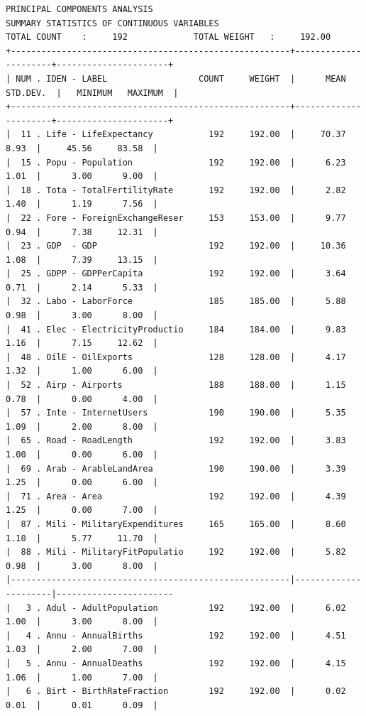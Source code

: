 \documentclass[a4paper,10pt,twocolumn]{article}
\begin{document}
\begin{landscape}
\begin{verbatim}
PRINCIPAL COMPONENTS ANALYSIS
SUMMARY STATISTICS OF CONTINUOUS VARIABLES
TOTAL COUNT    :     192             TOTAL WEIGHT   :     192.00
+-------------------------------------------------------+----------------------+----------------------+
| NUM . IDEN - LABEL                  COUNT     WEIGHT  |      MEAN  STD.DEV.  |   MINIMUM   MAXIMUM  |
+-------------------------------------------------------+----------------------+----------------------+
|  11 . Life - LifeExpectancy           192     192.00  |     70.37      8.93  |     45.56     83.58  |
|  15 . Popu - Population               192     192.00  |      6.23      1.01  |      3.00      9.00  |
|  18 . Tota - TotalFertilityRate       192     192.00  |      2.82      1.40  |      1.19      7.56  |
|  22 . Fore - ForeignExchangeReser     153     153.00  |      9.77      0.94  |      7.38     12.31  |
|  23 . GDP  - GDP                      192     192.00  |     10.36      1.08  |      7.39     13.15  |
|  25 . GDPP - GDPPerCapita             192     192.00  |      3.64      0.71  |      2.14      5.33  |
|  32 . Labo - LaborForce               185     185.00  |      5.88      0.98  |      3.00      8.00  |
|  41 . Elec - ElectricityProductio     184     184.00  |      9.83      1.16  |      7.15     12.62  |
|  48 . OilE - OilExports               128     128.00  |      4.17      1.32  |      1.00      6.00  |
|  52 . Airp - Airports                 188     188.00  |      1.15      0.78  |      0.00      4.00  |
|  57 . Inte - InternetUsers            190     190.00  |      5.35      1.09  |      2.00      8.00  |
|  65 . Road - RoadLength               192     192.00  |      3.83      1.00  |      0.00      6.00  |
|  69 . Arab - ArableLandArea           190     190.00  |      3.39      1.25  |      0.00      6.00  |
|  71 . Area - Area                     192     192.00  |      4.39      1.25  |      0.00      7.00  |
|  87 . Mili - MilitaryExpenditures     165     165.00  |      8.60      1.10  |      5.77     11.70  |
|  88 . Mili - MilitaryFitPopulatio     192     192.00  |      5.82      0.98  |      3.00      8.00  |
|-------------------------------------------------------|----------------------|-----------------------
|   3 . Adul - AdultPopulation          192     192.00  |      6.02      1.00  |      3.00      8.00  |
|   4 . Annu - AnnualBirths             192     192.00  |      4.51      1.03  |      2.00      7.00  |
|   5 . Annu - AnnualDeaths             192     192.00  |      4.15      1.06  |      1.00      7.00  |
|   6 . Birt - BirthRateFraction        192     192.00  |      0.02      0.01  |      0.01      0.09  |

\end{verbatim}
\end{landscape}
\end{document}
